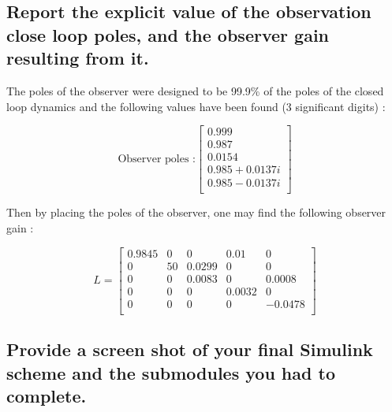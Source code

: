 \subsection{Report the explicit value of the observation close loop poles, and the observer gain resulting
from it.}
The poles of the observer were designed to be 99.9\% of the poles of the closed loop dynamics and the following values have been found (3 significant digits) :

\begin{equation}
    \text{Observer poles :}
    \left[\begin{array}{c}
         0.999\\
         0.987\\
         0.0154\\
         0.985 + 0.0137i\\
         0.985 - 0.0137i\\
    \end{array}
    \right]
\end{equation}

Then by placing the poles of the observer, one may find the following observer gain :

\begin{equation}
    L = 
    \left[ {\begin{array}{ccccc}
        0.9845 &0  &0      &0.01   &0         \\
        0      &50 &0.0299 &0      &0         \\
        0      &0  &0.0083 &0      &0.0008    \\
        0      &0  &0      &0.0032 &0         \\
        0      &0  &0      &0      &-0.0478   \\
    \end{array} } \right] 
\end{equation}

\subsection{Provide a screen shot of your final Simulink scheme and the submodules you had to complete.}

